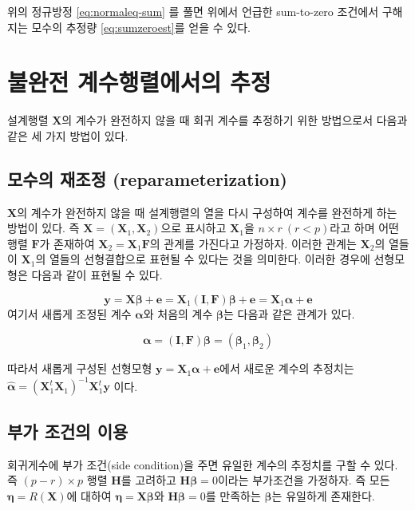 \documentclass[
]{book}
\theoremstyle{definition}
\theoremstyle{definition}
\theoremstyle{definition}
\theoremstyle{definition}
\theoremstyle{remark}
\begin{document}
위의 정규방정 \eqref{eq:normaleq-sum} 를 풀면 위에서 언급한 sum-to-zero 조건에서 구해지는 모수의 추정량 \eqref{eq:sumzeroest}를 얻을 수 있다.

\hypertarget{uxbd88uxc644uxc804-uxacc4uxc218uxd589uxb82cuxc5d0uxc11cuxc758-uxcd94uxc815}{%
\section{불완전 계수행렬에서의 추정}\label{uxbd88uxc644uxc804-uxacc4uxc218uxd589uxb82cuxc5d0uxc11cuxc758-uxcd94uxc815}}

설계행렬 \(\bm X\)의 계수가 완전하지 않을 때 회귀 계수를 추정하기 위한 방법으로서 다음과 같은 세 가지 방법이 있다.

\hypertarget{uxbaa8uxc218uxc758-uxc7acuxc870uxc815-reparameterization}{%
\subsection{모수의 재조정 (reparameterization)}\label{uxbaa8uxc218uxc758-uxc7acuxc870uxc815-reparameterization}}

\(\bm X\)의 계수가 완전하지 않을 때 설계행렬의 열을 다시 구성하여 계수를 완전하게 하는 방법이 있다. 즉 \(\bm X = (\bm X_1, \bm X_2)\)으로 표시하고 \(\bm X_1\)을 \(n \times r~ (r < p)\)라고 하며 어떤 행렬 \(\bm F\)가 존재하여 \(\bm X_2 = \bm X_1 \bm F\)의 관계를 가진다고 가정하자. 이러한 관계는 \(\bm X_2\)의 열들이 \(\bm X_1\)의 열들의 선형결합으로 표현될 수 있다는 것을 의미한다. 이러한 경우에 선형모형은 다음과 같이 표현될 수 있다.

\[
\bm y= \bm X \bm \beta + \bm e = \bm X_1 (\bm I, \bm F)\bm \beta  + \bm e = \bm X_1 \bm \alpha +\bm e
\]
여기서 새롭게 조정된 계수 \(\bm \alpha\)와 처음의 계수 \(\bm \beta\)는 다음과 같은 관계가 있다.

\[
\bm \alpha =   (\bm I, \bm F)\bm \beta = (\bm \beta_1,  \bm \beta_2)
\]

따라서 새롭게 구성된 선형모형 \(\bm y=\bm X_1 \bm \alpha +\bm e\)에서 새로운 계수의 추정치는 \(\hat {\bm \alpha} = (\bm X_1^t \bm X_1 )^{-1} \bm X_1^t \bm y\) 이다.

\hypertarget{uxbd80uxac00-uxc870uxac74uxc758-uxc774uxc6a9}{%
\subsection{부가 조건의 이용}\label{uxbd80uxac00-uxc870uxac74uxc758-uxc774uxc6a9}}

회귀게수에 부가 조건(side condition)을 주면 유일한 계수의 추정치를 구할 수 있다. 즉 \((p-r) \times p\) 행렬 \(\bm H\)를 고려하고 \(\bm H \bm \beta =0\)이라는 부가조건을 가정하자. 즉 모든 \(\bm \eta = R(\bm X)\)에 대하여 \(\bm \eta=\bm X \bm \beta\)와 \(\bm H \bm \beta =0\)를 만족하는 \(\bm \beta\)는 유일하게 존재한다.
\end{document}

